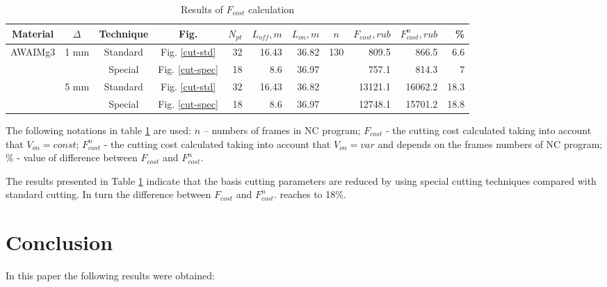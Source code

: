 \documentclass[runningheads]{llncs}
\begin{document}
\begin{table}
  \begin{tabular}{c | c | c | c | r r r | c | r r | r}
  Material & $\Delta$ & Technique & Fig. & $N_{pt}$ & $L_{off}, m$ & $L_{on}, m$ & $n$ & $F_{cost}, rub$ & $F^n_{cost}, rub$ & \% \\
  \hline \hline
  \multirow{4}{*}{AWAIMg3} & \multirow{2}{*}{1 mm} & Standard & Fig. \ref{cut-std}     & 32  & 16.43   & 36.82 & \multirow{4}{*}{130} & 809.5 & 866.5 & 6.6 \\
                         &                    & Special  & Fig. \ref{cut-spec} & 18  & 8.6  & 36.97 &                      & 757.1 & 814.3 & 7 \\
                         & \multirow{2}{*}{5 mm} & Standard & Fig. \ref{cut-std}  & 32 & 16.43 & 36.82 &                    & 13121.1 & 16062.2 & 18.3 \\
                         &                    & Special  & Fig. \ref{cut-spec}  & 18 & 8.6 & 36.97 &                      & 12748.1 & 15701.2 & 18.8 \\
  \hline
  \end{tabular}
  \caption{Results of $F_{cost}$ calculation}
  \label{f-cost}
\end{table}

The following notations in table \ref{f-cost}
are used:
$n$ – numbers of frames in NC program;
$F_{cost}$ - the cutting cost calculated taking into account that $V_{on}=const$;
$F^n_{cost}$ - the cutting cost calculated taking into account that $V_{on}=var$
and depends on the frames numbers of NC program;
\% - value of difference between
$F_{cost}$
and
$F^n_{cost}$.

The results presented in Table \ref{f-cost} indicate that
the basis cutting parameters are reduced by using special cutting techniques
compared with standard cutting.
In turn the difference between
$F_{cost}$
and
$F^n_{cost}$.
reaches to 18\%.

\section{Conclusion}

In this paper the following results were obtained:
\end{document}
